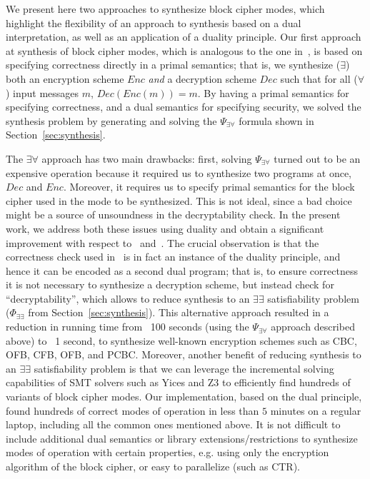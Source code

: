 \documentclass[preprint]{sig-alternate-05-2015}
\begin{document}
We present here two approaches to synthesize block cipher modes, 
which highlight the flexibility of an approach to synthesis 
based on a dual interpretation, as well as 
an application of a duality principle.
Our first approach at synthesis of block cipher modes, which is analogous to the 
one in~\cite{TGD15:CADE}, is based on 
specifying correctness 
directly in a primal semantics; that is, 
we synthesize ($\exists$) both an encryption scheme $Enc$ {\em{and}} a decryption
scheme $Dec$ such that for all ($\forall$) input messages $m$,
$Dec( Enc( m ) ) = m$. 
By having a primal semantics for specifying correctness, and a dual semantics
for specifying security, we solved the synthesis problem by generating
and solving the $\Psi_{\exists\forall}$ formula shown in Section~\ref{sec:synthesis}.

The $\exists\forall$ approach has two main drawbacks: first, solving 
$\Psi_{\exists\forall}$ turned out to be an expensive operation because 
it required us to synthesize two programs at once, $Dec$ and $Enc$. Moreover, 
it requires us to specify primal semantics for the block cipher
used in the mode to be synthesized. This is not ideal, since
a bad choice might be a source of unsoundness in the decryptability check.
In the present work, we address both these issues using duality and 
obtain a significant improvement with respect to~\cite{TGD15:CADE}
and~\cite{DBLP:conf/csfw/MalozemoffKG14}.
The crucial observation is that the correctness check used 
in~\cite{DBLP:conf/csfw/MalozemoffKG14} is in fact an instance of the duality principle, 
 and hence it can be 
encoded as a second dual program; that is,
to ensure correctness 
it is not necessary to synthesize a decryption scheme, but instead check for ``decryptability'',
which 
allows to reduce synthesis to an $\exists\exists$ satisfiability problem ($\Phi_{\exists\exists}$
from Section~\ref{sec:synthesis}). 
This alternative approach resulted in a reduction in running time
from ~100 seconds (using the $\Psi_{\exists\forall}$ approach described above) to
~1 second, to synthesize well-known encryption schemes such as CBC, OFB, CFB, OFB, and PCBC. 
Moreover, another benefit of 
reducing synthesis to an $\exists\exists$ satisfiability problem
is that we can leverage the incremental solving capabilities
of SMT solvers such as Yices and Z3 to efficiently
find hundreds of variants of block cipher modes.
Our implementation, based on the dual principle,
found hundreds 
of correct modes of operation in less than $5$ minutes on a regular laptop,
including all the common ones mentioned above.
It is not difficult to include additional 
dual semantics or library extensions/restrictions to synthesize
modes of operation with certain properties, e.g.
using only the encryption algorithm of the block cipher, 
or easy to parallelize (such as CTR).
\end{document}
